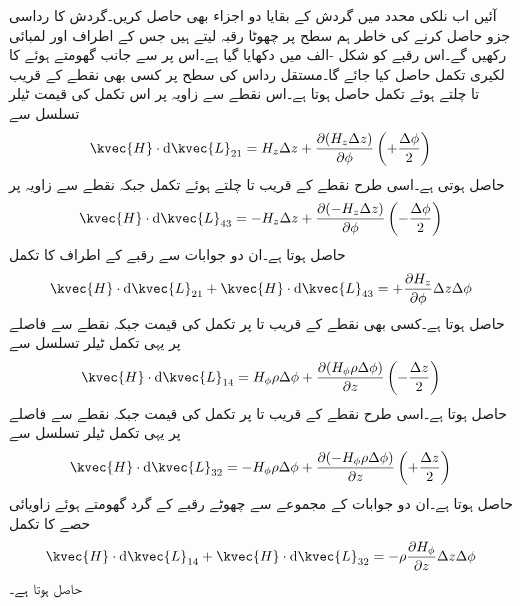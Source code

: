 آئیں اب نلکی محدد میں گردش کے بقایا دو اجزاء بھی حاصل کریں۔گردش کا رداسی جزو حاصل کرنے کی خاطر ہم  سطح پر چھوٹا رقبہ لیتے ہیں جس کے اطراف  اور  لمبائی رکھیں گے۔اس رقبے کو شکل -الف میں دکھایا گیا ہے۔اس پر  سے  جانب گھومتے ہوئے  کا لکیری تکمل حاصل کیا جائے گا۔مستقل رداس کی سطح پر کسی بھی نقطے کے قریب  تا  چلتے ہوئے تکمل  حاصل ہوتا ہے۔اس نقطے سے   زاویہ پر اس تکمل کی قیمت ٹیلر تسلسل سے
\begin{align*}
\kvec{H} \cdot \dif \kvec{L}_{21}=H_z \Delta z+\frac{\partial (H_z \Delta z)}{\partial \phi}\left(+\frac{\Delta \phi}{2}\right)
\end{align*}
حاصل ہوتی ہے۔اسی طرح نقطے  کے قریب  تا  چلتے ہوئے تکمل  جبکہ نقطے سے  زاویہ پر
\begin{align*}
\kvec{H} \cdot \dif \kvec{L}_{43}=-H_z \Delta z+\frac{\partial (-H_z \Delta z)}{\partial \phi}\left(-\frac{\Delta \phi}{2}\right)
\end{align*}
حاصل ہوتا ہے۔ان دو جوابات سے رقبے کے  اطراف کا تکمل
\begin{align}\label{مساوات_مقناطیسی_نلکی_رداسی_گردش_تکمل_الف}
\kvec{H} \cdot \dif \kvec{L}_{21}+\kvec{H} \cdot \dif \kvec{L}_{43}=+\frac{\partial H_z}{\partial \phi} \Delta z \Delta \phi
\end{align}
حاصل ہوتا ہے۔کسی بھی نقطے کے قریب  تا  پر تکمل کی قیمت  جبکہ نقطے سے  فاصلے پر یہی تکمل ٹیلر تسلسل سے
\begin{align*}
\kvec{H} \cdot \dif \kvec{L}_{14}=H_{\phi} \rho \Delta \phi+\frac{\partial (H_{\phi} \rho \Delta \phi)}{\partial z}\left(-\frac{\Delta z}{2}\right)
\end{align*}
حاصل ہوتا ہے۔اسی طرح نقطے کے قریب  تا  پر تکمل کی
 قیمت  جبکہ نقطے سے  فاصلے پر یہی تکمل ٹیلر تسلسل سے
\begin{align*}
\kvec{H} \cdot \dif \kvec{L}_{32}=-H_{\phi} \rho \Delta \phi+\frac{\partial (-H_{\phi} \rho \Delta \phi)}{\partial z}\left(+\frac{\Delta z}{2}\right)
\end{align*}
حاصل ہوتا ہے۔ان دو جوابات کے مجموعے سے چھوٹے رقبے کے گرد گھومتے ہوئے زاویائی حصے کا تکمل
\begin{align}\label{مساوات_مقناطیسی_نلکی_رداسی_گردش_تکمل_ب}
 \kvec{H} \cdot \dif \kvec{L}_{14}+\kvec{H} \cdot \dif \kvec{L}_{32}=-\rho\frac{\partial H_{\phi} }{\partial z}\Delta z\Delta \phi
\end{align}
حاصل ہوتا ہے۔


